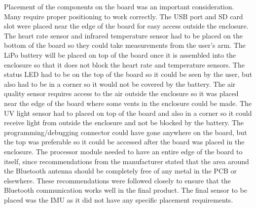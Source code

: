 Placement of the components on the board was an important consideration. Many 
require proper positioning to work correctly. The USB port and SD card 
slot were placed near the edge of the board for easy access outside the 
enclosure. The heart rate sensor and infrared temperature sensor had to be 
placed on the bottom of the board so they could take measurements from the 
user’s arm. The LiPo battery will be placed on top of the board once it is 
assembled into the enclosure so that it does not block the heart rate
and temperature sensors. The status LED had to be on the top of the board so it 
could be seen by the user, but also had to be in a corner so it would not be 
covered by the battery. The air quality sensor requires access to the air outside 
the enclosure so it was placed near the edge of the board where some vents in 
the enclosure could be made. The UV light sensor had to placed on top of the 
board and also in a corner so it could receive light from outside the enclosure 
and not be blocked by the battery. The programming/debugging connector could 
have gone anywhere on the board, but the top was preferable so it could 
be accessed after the board was placed in the enclosure. The processor
module needed to have an entire edge of the board to itself, since 
recommendations from the manufacturer stated that the area around the Bluetooth 
antenna should be completely free of any metal in the PCB or elsewhere. These 
recommendations were followed closely to ensure that the Bluetooth 
communication works well in the final product. The final sensor to be placed 
was the IMU as it did not have any specific placement requirements.

